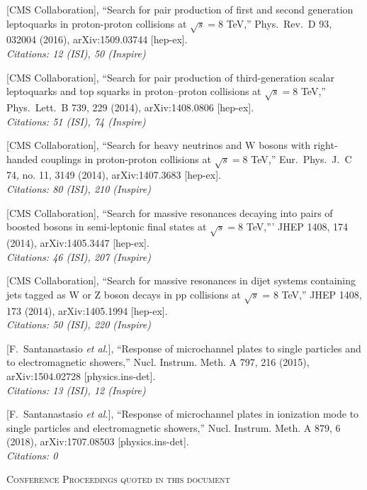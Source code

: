 \documentclass[10pt, a4paper]{article}
\begin{document}
\begin{thebibliography}{599}
[CMS Collaboration],
  ``Search for pair production of first and second generation
  leptoquarks in proton-proton collisions at $\sqrt{s}=8$ TeV,''
  Phys.\ Rev.\ D  93, 032004 (2016), arXiv:1509.03744 [hep-ex].\\
\emph{Citations: 12 (ISI), 50 (Inspire)}

  [CMS Collaboration],
  ``Search for pair production of third-generation scalar leptoquarks
  and top squarks in proton–proton collisions at $\sqrt{s}=8$ TeV,''
  Phys.\ Lett.\ B 739, 229 (2014), arXiv:1408.0806 [hep-ex].\\
\emph{Citations: 51 (ISI), 74 (Inspire)}

  [CMS Collaboration],
  ``Search for heavy neutrinos and $\mathrm {W}$ bosons with
  right-handed couplings in proton-proton collisions at $\sqrt{s}=8$ TeV,''
  Eur.\ Phys.\ J.\ C 74, no. 11, 3149 (2014), arXiv:1407.3683 [hep-ex].\\
\emph{Citations: 80 (ISI), 210 (Inspire)}

  [CMS Collaboration],
  ``Search for massive resonances decaying into pairs of boosted
  bosons in semi-leptonic final states at $\sqrt{s}=8$ TeV,'''
  JHEP 1408, 174 (2014), arXiv:1405.3447 [hep-ex].\\
\emph{Citations: 46 (ISI), 207 (Inspire)}

 [CMS Collaboration],
  ``Search for massive resonances in dijet systems containing jets
  tagged as W or Z boson decays in pp collisions at $ \sqrt{s} $ = 8 TeV,''
  JHEP 1408, 173 (2014), arXiv:1405.1994 [hep-ex].\\
\emph{Citations: 50 (ISI), 220 (Inspire)}

[F.~Santanastasio {\it et al.}],
  ``Response of microchannel plates to single particles and to electromagnetic showers,''
Nucl. Instrum. Meth. A 797, 216 (2015), arXiv:1504.02728 [physics.ins-det].\\
\emph{Citations: 13 (ISI), 12 (Inspire)}

[F.~Santanastasio {\it et al.}],
  ``Response of microchannel plates in ionization mode to single particles and electromagnetic showers,''
  Nucl. Instrum. Meth. A 879, 6 (2018), arXiv:1707.08503 [physics.ins-det].\\
\emph{Citations: 0}

\vspace{0.3cm} \begin{center} \textsc{Conference Proceedings quoted in
    this document} \end{center} \vspace{0.05cm}


\end{thebibliography}
\end{document}
